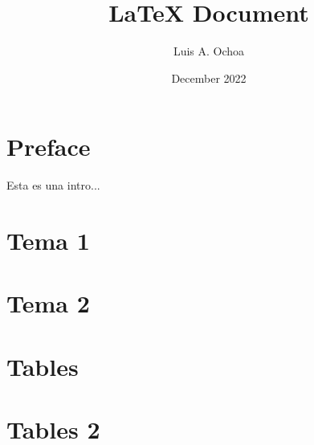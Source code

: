 \documentclass[12pt, letterpaper]{memoir}
\begin{document}
%
%
\title{LaTeX Document}
\author{Luis A. Ochoa}
\date{December 2022}
\maketitle
%
\clearpage
\tableofcontents
\clearpage
\listoffigures
\clearpage
\listoftables
%
\chapter{Preface}
  \lipsum[2-4]

Esta es una intro...

%
%
\mainmatter

\chapter{Tema 1}
  

\chapter{Tema 2}
  

%
%
\appendix

\chapter{Tables}
  

\chapter{Tables 2}
  

%
%
\backmatter

\printbibliography[heading=bibintoc]
\end{document}
